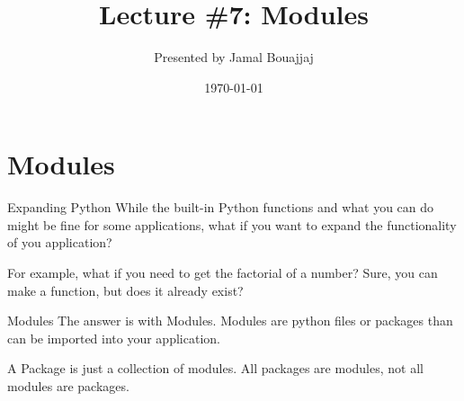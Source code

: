 %
%



\title{Lecture \#7: Modules}
\date{\today}
\author{Presented by Jamal Bouajjaj}

\makeatletter
{}%
\makeatother



\maketitle

\section{Modules}

\begin{frame}{Expanding Python}
  While the built-in Python functions and what you can do might be fine for some applications, what if you want to expand the functionality of you application?

  For example, what if you need to get the factorial of a number? Sure, you can make a function, but does it already exist?
\end{frame}

\begin{frame}{Modules}
  The answer is with Modules. Modules are python files or packages than can be imported into your application.

  A Package is just a collection of modules. All packages are modules, not all modules are packages.
\end{frame}

